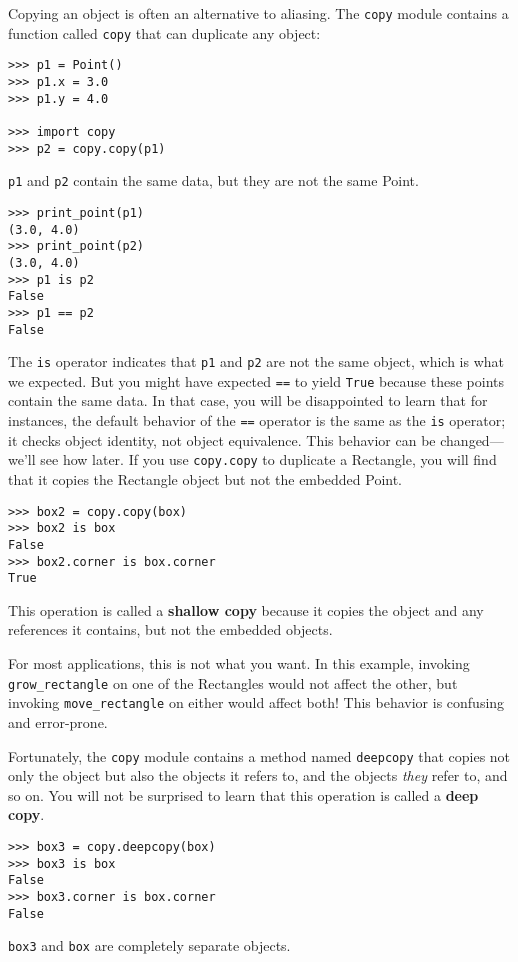 \documentclass{article}
\begin{document}
Copying an object is often an alternative to aliasing. The \verb|copy|
module contains a function called \verb|copy| that can duplicate any
object:
\begin{verbatim}
>>> p1 = Point()
>>> p1.x = 3.0
>>> p1.y = 4.0

>>> import copy
>>> p2 = copy.copy(p1)
\end{verbatim}
\verb|p1| and \verb|p2| contain the same data, but they are not the same
Point.
\begin{verbatim}
>>> print_point(p1)
(3.0, 4.0)
>>> print_point(p2)
(3.0, 4.0)
>>> p1 is p2
False
>>> p1 == p2
False
\end{verbatim}
The \verb|is| operator indicates that \verb|p1| and \verb|p2| are not the
same object, which is what we expected. But you might have expected
\verb|==| to yield \verb|True| because these points contain the same data.
In that case, you will be disappointed to learn that for instances, the
default behavior of the \verb|==| operator is the same as the \verb|is|
operator; it checks object identity, not object equivalence.  This behavior
can be changed—we’ll see how later.  If you use \verb|copy.copy| to
duplicate a Rectangle, you will find that it copies the Rectangle object
but not the embedded Point.
\begin{verbatim}
>>> box2 = copy.copy(box)
>>> box2 is box
False
>>> box2.corner is box.corner
True
\end{verbatim}
This operation is called a \textbf{shallow copy} because it copies the object
and any references it contains, but not the embedded objects.

For most applications, this is not what you want. In this example, invoking
\verb|grow_rectangle| on one of the Rectangles would not affect the other,
but invoking \verb|move_rectangle| on either would affect both! This
behavior is confusing and error-prone.

Fortunately, the \verb|copy| module contains a method named \verb|deepcopy| that copies
not only the object but also the objects it refers to, and the objects
\emph{they}
refer to, and so on. You will not be surprised to learn that this operation
is called a \textbf{deep copy}.
\begin{verbatim}
>>> box3 = copy.deepcopy(box)
>>> box3 is box
False
>>> box3.corner is box.corner
False
\end{verbatim}
\verb|box3| and \verb|box| are completely separate objects.
\end{document}
